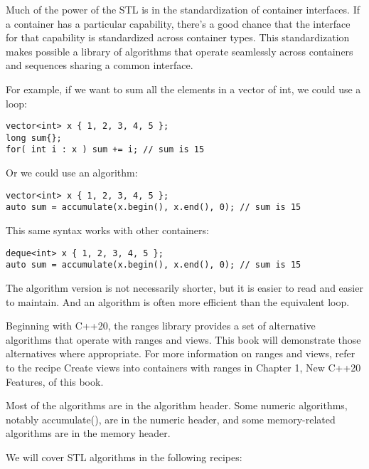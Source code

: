 Much of the power of the STL is in the standardization of container interfaces. If a container has a particular capability, there's a good chance that the interface for that capability is standardized across container types. This standardization makes possible a library of algorithms that operate seamlessly across containers and sequences sharing a common interface.

For example, if we want to sum all the elements in a vector of int, we could use a loop:

\begin{lstlisting}[style=styleCXX]
vector<int> x { 1, 2, 3, 4, 5 };
long sum{};
for( int i : x ) sum += i; // sum is 15
\end{lstlisting}

Or we could use an algorithm:

\begin{lstlisting}[style=styleCXX]
vector<int> x { 1, 2, 3, 4, 5 };
auto sum = accumulate(x.begin(), x.end(), 0); // sum is 15
\end{lstlisting}

This same syntax works with other containers:

\begin{lstlisting}[style=styleCXX]
deque<int> x { 1, 2, 3, 4, 5 };
auto sum = accumulate(x.begin(), x.end(), 0); // sum is 15
\end{lstlisting}

The algorithm version is not necessarily shorter, but it is easier to read and easier to maintain. And an algorithm is often more efficient than the equivalent loop.

Beginning with C++20, the ranges library provides a set of alternative algorithms that operate with ranges and views. This book will demonstrate those alternatives where appropriate. For more information on ranges and views, refer to the recipe Create views into containers with ranges in Chapter 1, New C++20 Features, of this book.

Most of the algorithms are in the algorithm header. Some numeric algorithms, notably accumulate(), are in the numeric header, and some memory-related algorithms are in the memory header.

We will cover STL algorithms in the following recipes:

